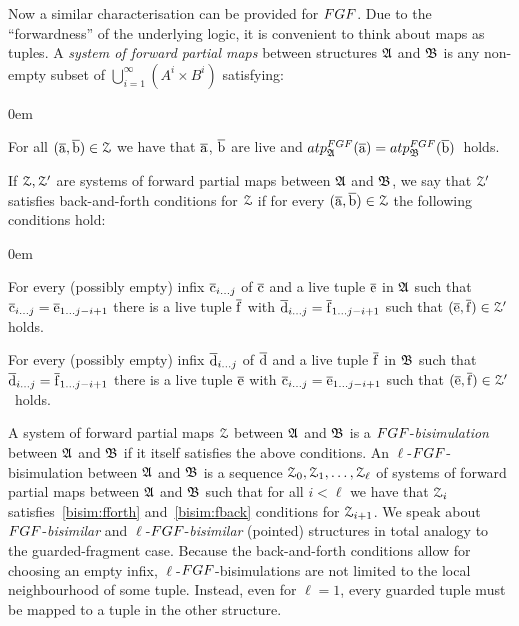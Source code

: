 \noindent
Now a similar characterisation can be provided for $\FGF$. 
Due to the ``forwardness'' of the underlying logic, it is convenient to think about maps as tuples.
A \emph{system of forward partial maps} between structures ${\mathfrak{A}}$ and ${\mathfrak{B}}$ is any non-empty subset of $\bigcup_{i=1}^{\infty} (A^i \times B^i)$ satisfying:
\begin{description}\itemsep0em
  \item[\desclabel{(AtomicEq)}{bisim:atomiceq}] For all $(\overline{\mathrm{a}}, \overline{\mathrm{b}}) \in \mathcal{Z}$ we have that $\overline{\mathrm{a}}$, $\overline{\mathrm{b}}$ are live and $\atp{\FGF}{\str{A}}{\elemtuplea} = \atp{\FGF}{\str{B}}{\elemtupleb}$~holds.
\end{description}
If $\mathcal{Z}, \mathcal{Z}'$ are systems of forward partial maps between ${\mathfrak{A}}$ and ${\mathfrak{B}}$, we say that $\mathcal{Z}'$ satisfies back-and-forth conditions for $\mathcal{Z}$ if for every $(\overline{\mathrm{a}}, \overline{\mathrm{b}}) \in \mathcal{Z}$ the following conditions hold:
\begin{description}\itemsep0em
  \item[\desclabel{(fForth)}{bisim:fforth}] For every (possibly empty) infix $\overline{\mathrm{c}}_{i\ldots j}$ of $\overline{\mathrm{c}}$ and a live tuple $\overline{\mathrm{e}}$ in ${\mathfrak{A}}$ such that $\overline{\mathrm{c}}_{i\ldots j} = \overline{\mathrm{e}}_{1\ldots j{-}i{+}1}$ there is a live tuple $\overline{\mathrm{f}}$ with $\overline{\mathrm{d}}_{i\ldots j} = {\overline{\mathrm{f}}}_{1\dots j{-}i{+}1}$ such that $(\overline{\mathrm{e}}, \overline{\mathrm{f}}) \in \mathcal{Z}'$ holds.
  \item[\desclabel{(fBack)}{bisim:fback}] For every (possibly empty) infix $\overline{\mathrm{d}}_{i\ldots j}$ of $\overline{\mathrm{d}}$ and a live tuple $\overline{\mathrm{f}}$ in ${\mathfrak{B}}$ such that $\overline{\mathrm{d}}_{i\ldots j} = {\overline{\mathrm{f}}}_{1\dots j{-}i{+}1}$ there is a live tuple $\overline{\mathrm{e}}$ with $\overline{\mathrm{c}}_{i\ldots j} = \overline{\mathrm{e}}_{1\ldots j{-}i{+}1}$ such that $(\overline{\mathrm{e}}, \overline{\mathrm{f}}) \in \mathcal{Z}'$~holds.
\end{description}
A system of forward partial maps $\mathcal{Z}$ between ${\mathfrak{A}}$ and ${\mathfrak{B}}$ is a $\FGF$-\emph{bisimulation} between ${\mathfrak{A}}$ and ${\mathfrak{B}}$ if it itself satisfies the above conditions.
An $\ell$-$\FGF$-bisimulation between ${\mathfrak{A}}$ and ${\mathfrak{B}}$ is a sequence $\mathcal{Z}_0, \mathcal{Z}_1, \ldots, \mathcal{Z}_\ell$ of systems of forward partial maps between ${\mathfrak{A}}$ and ${\mathfrak{B}}$ such that for all $i < \ell$ we have that $\mathcal{Z}_i$ satisfies~\ref{bisim:fforth} and~\ref{bisim:fback} conditions for $\mathcal{Z}_{i{+}1}$.
We speak about $\FGF$-\emph{bisimilar} and $\ell$-$\FGF$-\emph{bisimilar} (pointed) structures in total analogy to the guarded-fragment case.
Because the back-and-forth conditions allow for choosing an empty infix, $\ell$-$\FGF$-bisimulations are not limited to the local neighbourhood of some tuple.
Instead, even for $\ell = 1$, every guarded tuple must be mapped to a tuple in the other structure.

